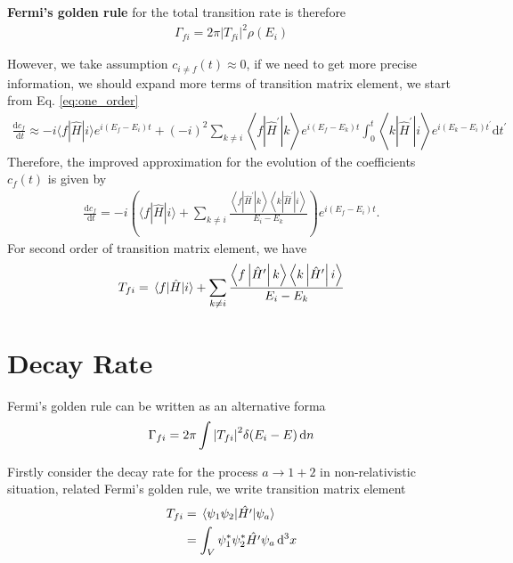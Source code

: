 \textbf{Fermi's golden rule} for the total transition rate is therefore
\begin{align}
    \Gamma_{fi}=2\pi \left|T_{f i}\right|^2 \rho(E_{i})
\end{align}

However, we take assumption $c_{i\neq f}(t)\approx 0$, if we need to get more precise information, we should expand more terms of transition matrix element, we start from Eq. \ref{eq:one_order}
\begin{align}
    \frac{\mathrm{d} c_f}{\mathrm{~d} t} \approx-i\langle f|\hat{H}| i\rangle e^{i\left(E_f-E_i\right) t}+(-i)^2 \sum_{k \neq i}\left\langle f\left|\hat{H}^{\prime}\right| k\right\rangle e^{i\left(E_f-E_k\right) t} \int_0^t\left\langle k\left|\hat{H}^{\prime}\right| i\right\rangle e^{i\left(E_k-E_i\right) t^{\prime}} \mathrm{d} t^{\prime}
\end{align}
Therefore, the improved approximation for the evolution of the coefficients $c_{f}(t)$ is given by
\begin{align}
    \frac{\mathrm{d} c_f}{\mathrm{~d} t}=-i\left(\langle f|\hat{H}| i\rangle+\sum_{k \neq i} \frac{\left\langle f\left|\hat{H}^{\prime}\right| k\right\rangle\left\langle k\left|\hat{H}^{\prime}\right| i\right\rangle}{E_i-E_k}\right) e^{i\left(E_f-E_i\right) t}.
\end{align}
For second order of transition matrix element, we have 
\begin{align}
    T_{fi}=\matrixel{f}{\hat{H}}{i}+\sum_{k \neq i} \frac{\left\langle f\left|\hat{H}^{\prime}\right| k\right\rangle\left\langle k\left|\hat{H}^{\prime}\right| i\right\rangle}{E_i-E_k}
\end{align}

\section{Decay Rate}

Fermi's golden rule can be written as an alternative forma
\begin{align}
    \Gamma_{fi}=2\pi\int\abs{T_{fi}}^{2}\delta(E_{i}-E)\dd{n}\label{eq:fermi2}
\end{align}

Firstly consider the decay rate for the process $a\rightarrow 1+2$ in non-relativistic situation, related Fermi's golden rule, we write transition matrix element 
\begin{align}
    T_{fi}&=\matrixel{\psi_{1}\psi_{2}}{\hat{H'}}{\psi_{a}}\\
    &=\int_{V}\psi^{*}_1 \psi^{*}_2\hat{H'}\psi_{a}\dd[3]{x}
\end{align}

